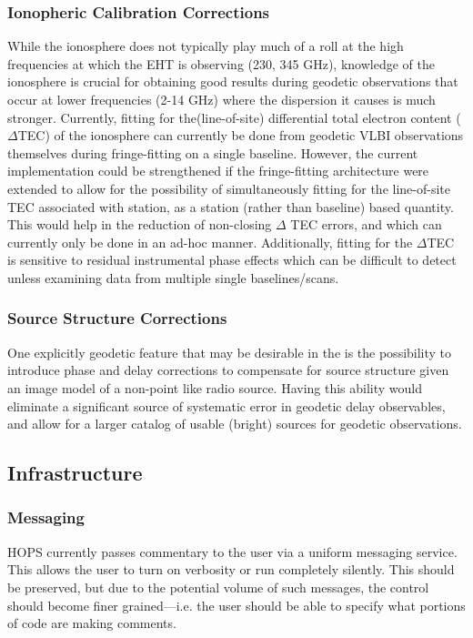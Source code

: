 \subsubsection{Ionopheric Calibration Corrections}
\label{sec:ionoscalcorr}

While the ionosphere does not typically play much of a roll at the high frequencies at which the EHT is observing (230, 345 GHz), knowledge of the ionosphere is crucial for obtaining
good results during geodetic observations that occur at lower frequencies (2-14 GHz) where the dispersion it causes is much stronger. Currently, fitting for the(line-of-site) differential total electron content ($\Delta$TEC) of the
ionosphere can currently be done from geodetic VLBI observations themselves during fringe-fitting on a single baseline. However, the current implementation could be strengthened if the fringe-fitting architecture were extended to allow for the possibility
of simultaneously fitting for the line-of-site TEC associated with station, as a station (rather than baseline) based quantity. This would help in the reduction of non-closing $\Delta$ TEC errors, and which can currently only be
done in an ad-hoc manner. Additionally, fitting for the $\Delta$TEC is sensitive to residual instrumental phase effects which can be difficult to detect unless examining data from multiple single baselines/scans.


\subsubsection{Source Structure Corrections}
\label{sec:sourcestructcorr}

One explicitly geodetic feature that may be desirable in the \nuHOPS is the possibility to introduce phase and delay corrections to compensate for source structure given an image model of a non-point like radio source. Having this ability would
eliminate a significant source of systematic error in geodetic delay observables, and allow for a larger catalog of usable (bright) sources for geodetic observations.



\subsection{Infrastructure}
\label{sec:infra}

\subsubsection{Messaging}
\label{sec:msg}
HOPS currently passes commentary to the user via a uniform messaging
service.  This allows the user to turn on verbosity or run completely
silently.  This should be preserved, but due to the potential volume
of such messages, the control should become finer grained---i.e. the
user should be able to specify what portions of code are making comments.

